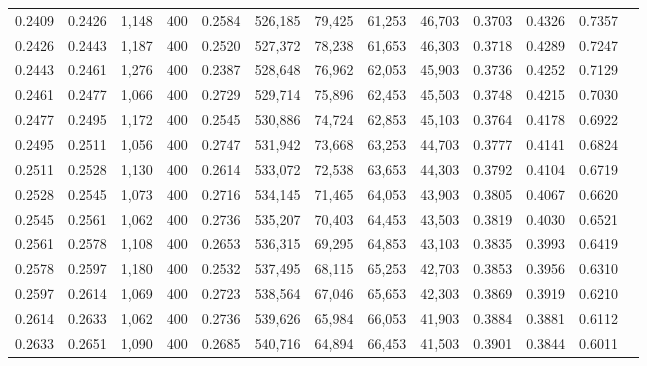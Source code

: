 \begin{tabular}{rrrrrrrrrrrrr}
0.2409 & 0.2426 &  1,148 & 400 &                                     0.2584 & 526,185 &  79,425 &  61,253 &  46,703 & 0.3703 & 0.4326 & 0.7357 \\
0.2426 & 0.2443 &  1,187 & 400 &                                     0.2520 & 527,372 &  78,238 &  61,653 &  46,303 & 0.3718 & 0.4289 & 0.7247 \\
0.2443 & 0.2461 &  1,276 & 400 &                                     0.2387 & 528,648 &  76,962 &  62,053 &  45,903 & 0.3736 & 0.4252 & 0.7129 \\
0.2461 & 0.2477 &  1,066 & 400 &                                     0.2729 & 529,714 &  75,896 &  62,453 &  45,503 & 0.3748 & 0.4215 & 0.7030 \\
0.2477 & 0.2495 &  1,172 & 400 &                                     0.2545 & 530,886 &  74,724 &  62,853 &  45,103 & 0.3764 & 0.4178 & 0.6922 \\
0.2495 & 0.2511 &  1,056 & 400 &                                     0.2747 & 531,942 &  73,668 &  63,253 &  44,703 & 0.3777 & 0.4141 & 0.6824 \\
0.2511 & 0.2528 &  1,130 & 400 &                                     0.2614 & 533,072 &  72,538 &  63,653 &  44,303 & 0.3792 & 0.4104 & 0.6719 \\
0.2528 & 0.2545 &  1,073 & 400 &                                     0.2716 & 534,145 &  71,465 &  64,053 &  43,903 & 0.3805 & 0.4067 & 0.6620 \\
0.2545 & 0.2561 &  1,062 & 400 &                                     0.2736 & 535,207 &  70,403 &  64,453 &  43,503 & 0.3819 & 0.4030 & 0.6521 \\
0.2561 & 0.2578 &  1,108 & 400 &                                     0.2653 & 536,315 &  69,295 &  64,853 &  43,103 & 0.3835 & 0.3993 & 0.6419 \\
0.2578 & 0.2597 &  1,180 & 400 &                                     0.2532 & 537,495 &  68,115 &  65,253 &  42,703 & 0.3853 & 0.3956 & 0.6310 \\
0.2597 & 0.2614 &  1,069 & 400 &                                     0.2723 & 538,564 &  67,046 &  65,653 &  42,303 & 0.3869 & 0.3919 & 0.6210 \\
0.2614 & 0.2633 &  1,062 & 400 &                                     0.2736 & 539,626 &  65,984 &  66,053 &  41,903 & 0.3884 & 0.3881 & 0.6112 \\
0.2633 & 0.2651 &  1,090 & 400 &                                     0.2685 & 540,716 &  64,894 &  66,453 &  41,503 & 0.3901 & 0.3844 & 0.6011 \\

\end{tabular}
